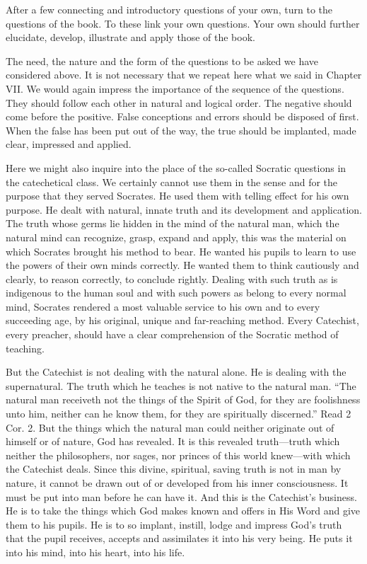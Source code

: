 After a few connecting and introductory questions of your own, turn to the questions of the book. To these link your own questions. Your own should further elucidate, develop, illustrate and apply those of the book.

The need, the nature and the form of the questions to be asked we have considered above. It is not necessary that we repeat here what we said in Chapter VII. We would again impress the importance
of the sequence of the questions. They should follow each other in natural and logical order. The negative should come before the positive. False conceptions and errors should be disposed of first. When the false has been put out of the way, the true should be implanted, made clear, impressed and applied.

Here we might also inquire into the place of the so-called Socratic questions in the catechetical class. We certainly cannot use them in the sense and for the purpose that they served Socrates. He used them with telling effect for his own purpose. He dealt with natural, innate truth and its development and application. The truth whose germs lie hidden in the mind of the natural man, which the natural mind can recognize, grasp, expand and apply, this was the material on which Socrates brought his method to bear. He wanted his pupils to learn to use the powers of their own minds correctly. He wanted them to think cautiously and clearly, to reason correctly, to conclude rightly. Dealing with such truth as is indigenous to the human soul and with such powers as belong to every normal mind, Socrates rendered a most valuable service to his own and to every succeeding age, by his original, unique and far-reaching method. Every Catechist, every preacher, should have a clear comprehension of the Socratic method of teaching.

But the Catechist is not dealing with the natural alone. He is dealing with the supernatural. The truth which he teaches is not native to the natural man. “The natural man receiveth not the things of the Spirit of God, for they are foolishness unto him, neither can he know them, for they are spiritually discerned.” Read 2 Cor. 2. But the things which the natural man could neither originate out of himself or of nature, God has revealed. It is this revealed truth—truth which neither the philosophers, nor sages, nor princes of this world knew—with which the Catechist deals. Since this divine, spiritual, saving truth is not in man by nature, it cannot be drawn out of or developed from his inner consciousness. It must be put into man before he can have it. And this is the Catechist’s business. He is to take the things which God makes known and offers in His Word and give them to his pupils. He is to so implant, instill, lodge and impress God’s truth that the pupil receives, accepts and assimilates it into his very being. He puts it into his mind, into his heart, into his life.

